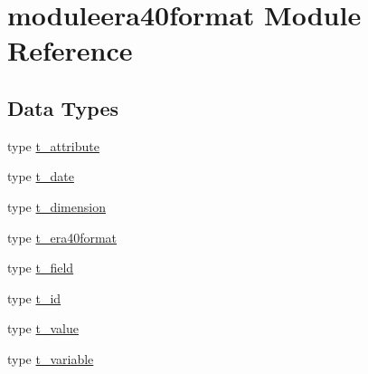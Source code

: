 \hypertarget{namespacemoduleera40format}{}\section{moduleera40format Module Reference}
\label{namespacemoduleera40format}
\subsection*{Data Types}
\begin{DoxyCompactItemize}
\item 
type \mbox{\hyperlink{structmoduleera40format_1_1t__attribute}{t\+\_\+attribute}}
\item 
type \mbox{\hyperlink{structmoduleera40format_1_1t__date}{t\+\_\+date}}
\item 
type \mbox{\hyperlink{structmoduleera40format_1_1t__dimension}{t\+\_\+dimension}}
\item 
type \mbox{\hyperlink{structmoduleera40format_1_1t__era40format}{t\+\_\+era40format}}
\item 
type \mbox{\hyperlink{structmoduleera40format_1_1t__field}{t\+\_\+field}}
\item 
type \mbox{\hyperlink{structmoduleera40format_1_1t__id}{t\+\_\+id}}
\item 
type \mbox{\hyperlink{structmoduleera40format_1_1t__value}{t\+\_\+value}}
\item 
type \mbox{\hyperlink{structmoduleera40format_1_1t__variable}{t\+\_\+variable}}
\end{DoxyCompactItemize}
